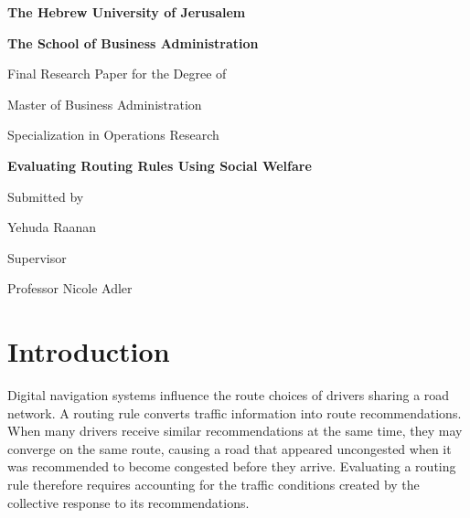 \documentclass{article}
\begin{document}
\begin{titlepage}
\centering

{\large\textbf{The Hebrew University of Jerusalem}\par}
\vspace{0.35cm}
{\large\textbf{The School of Business Administration}\par}

\vfill

{\large Final Research Paper for the Degree of\par}
\vspace{0.2cm}
{\large Master of Business Administration\par}
\vspace{0.2cm}
{\large Specialization in Operations Research\par}

\vfill

{\LARGE\textbf{Evaluating Routing Rules Using Social Welfare}\par}

\vfill

{\large Submitted by\par}
\vspace{0.2cm}
{\large Yehuda Raanan\par}

\vspace{1.2cm}

{\large Supervisor\par}
\vspace{0.2cm}
{\large Professor Nicole Adler\par}

\end{titlepage}

\setcounter{tocdepth}{1}
\tableofcontents
\clearpage
{}

\section{Introduction}
Digital navigation systems influence the route choices of drivers sharing a road network. A routing rule converts traffic information into route recommendations. When many drivers receive similar recommendations at the same time, they may converge on the same route, causing a road that appeared uncongested when it was recommended to become congested before they arrive. Evaluating a routing rule therefore requires accounting for the traffic conditions created by the collective response to its recommendations.
\end{document}
